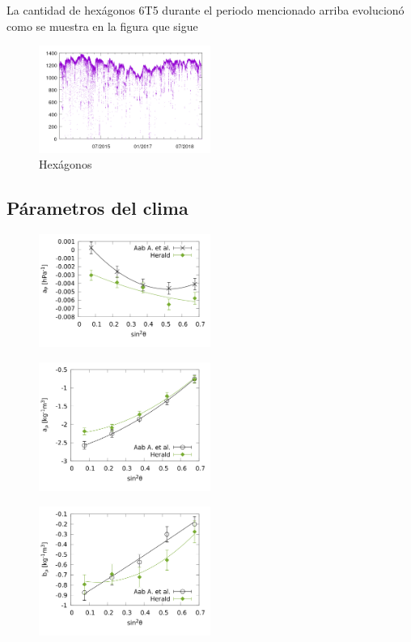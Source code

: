 La cantidad de hexágonos 6T5 durante el periodo mencionado arriba evolucionó como se muestra  en la figura que sigue


\begin{figure}[H]
	\centering
	\includegraphics[width=0.5\textwidth]{hex_rango_corto.png}
	\caption{Hexágonos}
\end{figure}


\subsection{Párametros del clima}

\begin{figure}[H]
	\centering
	\includegraphics[width=0.5\textwidth]{ap.png}
\end{figure}


\begin{figure}[H]
	\centering
	\includegraphics[width=0.5\textwidth]{arho.png}
\end{figure}


\begin{figure}[H]
	\centering
	\includegraphics[width=0.5\textwidth]{brho.png}
\end{figure}




